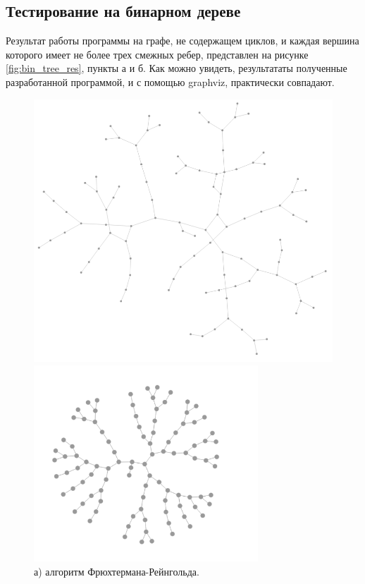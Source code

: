 \documentclass[14pt, russian]{scrartcl}
\begin{document}
\subsection{Тестирование на бинарном дереве}

Результат работы программы на графе, не содержащем циклов,  и  каждая вершина которого имеет не более трех смежных ребер, представлен на рисунке \ref{fig:bin_tree_res}, пункты а и б. Как можно увидеть, результататы полученные разработанной программой, и с помощью graphviz, практически совпадают.

\begin{figure}[H]
	\centering
	\begin{minipage}[t]{.43\textwidth}
		\centering
		\includegraphics[width=\linewidth]{./imgs/fr_btree.png}
		\caption*{а) алгоритм Фрюхтермана-Рейнгольда.}
	\end{minipage}
	\noindent
	\begin{minipage}[t]{.56\linewidth}
		\centering
		\includegraphics[width=0.75\textwidth]{./imgs/kk_btree.png}

\end{minipage}
\end{figure}
\end{document}
